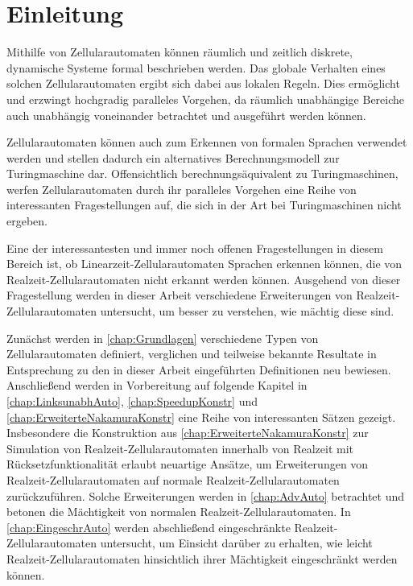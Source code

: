 \chapter{Einleitung}

Mithilfe von Zellularautomaten können räumlich und zeitlich diskrete, dynamische Systeme formal beschrieben werden.
Das globale Verhalten eines solchen Zellularautomaten ergibt sich dabei aus lokalen Regeln.
Dies ermöglicht und erzwingt hochgradig paralleles Vorgehen, da räumlich unabhängige Bereiche auch unabhängig voneinander betrachtet und ausgeführt werden können.

Zellularautomaten können auch zum Erkennen von formalen Sprachen verwendet werden und stellen dadurch ein alternatives Berechnungsmodell zur Turingmaschine dar.
Offensichtlich berechnungsäquivalent zu Turingmaschinen, werfen Zellularautomaten durch ihr paralleles Vorgehen eine Reihe von interessanten Fragestellungen auf,
die sich in der Art bei Turingmaschinen nicht ergeben.

Eine der interessantesten und immer noch offenen Fragestellungen in diesem Bereich ist,
ob Linearzeit-Zellularautomaten Sprachen erkennen können, die von Realzeit-Zellularautomaten nicht erkannt werden können.
Ausgehend von dieser Fragestellung werden in dieser Arbeit verschiedene Erweiterungen von Realzeit-Zellularautomaten untersucht,
um besser zu verstehen, wie mächtig diese sind.

Zunächst werden in \cref{chap:Grundlagen} verschiedene Typen von Zellularautomaten definiert, verglichen und teilweise bekannte Resultate
in Entsprechung zu den in dieser Arbeit eingeführten Definitionen neu bewiesen.
Anschließend werden in Vorbereitung auf folgende Kapitel in \cref{chap:LinksunabhAuto}, \cref{chap:SpeedupKonstr} und \cref{chap:ErweiterteNakamuraKonstr}
eine Reihe von interessanten Sätzen gezeigt.
Insbesondere die Konstruktion aus \cref{chap:ErweiterteNakamuraKonstr}
zur Simulation von Realzeit-Zellularautomaten innerhalb von Realzeit mit Rücksetzfunktionalität
erlaubt neuartige Ansätze, um Erweiterungen von Realzeit-Zellularautomaten auf normale Realzeit-Zellularautomaten zurückzuführen.
Solche Erweiterungen werden in \cref{chap:AdvAuto} betrachtet und betonen die Mächtigkeit von normalen Realzeit-Zellularautomaten.
In \cref{chap:EingeschrAuto} werden abschließend eingeschränkte Realzeit-Zellularautomaten untersucht, um Einsicht darüber zu erhalten,
wie leicht Realzeit-Zellularautomaten hinsichtlich ihrer Mächtigkeit eingeschränkt werden können.

